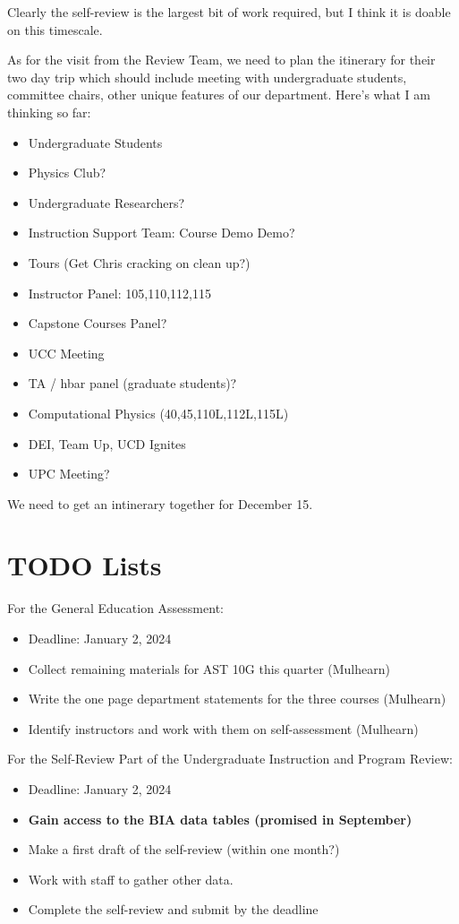 \documentclass[12pt]{article}
\begin{document}
Clearly the self-review is the largest bit of work required, but I think it is doable on this timescale.

As for the visit from the Review Team, we need to plan the itinerary for their two day trip which should include meeting with undergraduate students, committee chairs, other unique features of our department.  Here's what I am thinking so far:
\begin{itemize}
\item Undergraduate Students
\item Physics Club?
\item Undergraduate Researchers?
\item Instruction Support Team:  Course Demo Demo?
\item Tours (Get Chris cracking on clean up?)
\item Instructor Panel: 105,110,112,115
\item Capstone Courses Panel?
\item UCC Meeting
\item TA / hbar panel (graduate students)?
\item Computational Physics (40,45,110L,112L,115L)
\item DEI, Team Up, UCD Ignites
\item UPC Meeting?
\end{itemize}
We need to get an intinerary together for December 15.

\section{TODO Lists}

\noindent
For the General Education Assessment:
\begin{itemize}
\item Deadline:  January 2, 2024
\item Collect remaining materials for AST 10G this quarter (Mulhearn)
\item Write the one page department statements for the three courses (Mulhearn)
\item Identify instructors and work with them on self-assessment (Mulhearn)
\end{itemize}

\noindent
For the Self-Review Part of the Undergraduate Instruction and Program Review:
\begin{itemize}
\item Deadline:  January 2, 2024  
\item {\bf Gain access to the BIA data tables (promised in September)}
\item Make a first draft of the self-review (within one month?)
\item Work with staff to gather other data.
\item Complete the self-review and submit by the deadline
\end{itemize}
\end{document}
